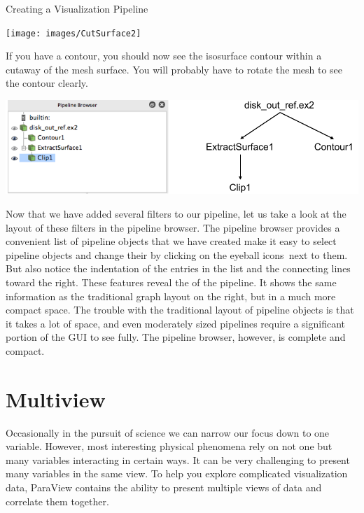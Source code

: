 \begin{exercise}{Creating a Visualization Pipeline}
  \begin{inlinefig}
    \texttt{[image: images/CutSurface2]}
  \end{inlinefig}

  If you have a contour, you should now see the isosurface contour within a
  cutaway of the mesh surface.  You will probably have to rotate the mesh
  to see the contour clearly.
\end{exercise}


\begin{inlinefig}
  \includegraphics[width=\linewidth]{images/PipelineBrowserStructure}
\end{inlinefig}

Now that we have added several filters to our pipeline, let us take a look
at the layout of these filters in the pipeline browser.  The pipeline
browser provides a convenient list of pipeline objects that we have created
make it easy to select pipeline objects and change their
 by clicking on the eyeball icons~\eyeball next to
them.  But also notice the indentation of the entries in the list and the
connecting lines toward the right.  These features reveal the
 of the pipeline.  It shows the same information as
the traditional graph layout on the right, but in a much more compact
space.  The trouble with the traditional layout of pipeline objects is that
it takes a lot of space, and even moderately sized pipelines require a
significant portion of the GUI to see fully.  The pipeline browser,
however, is complete and compact.




\section{Multiview}
\label{sec:Multiview}

Occasionally in the pursuit of science we can narrow our focus down to one
variable.  However, most interesting physical phenomena rely on not one but
many variables interacting in certain ways.  It can be very challenging to
present many variables in the same view.  To help you explore complicated
visualization data, ParaView contains the ability to present multiple views
of data and correlate them together.

